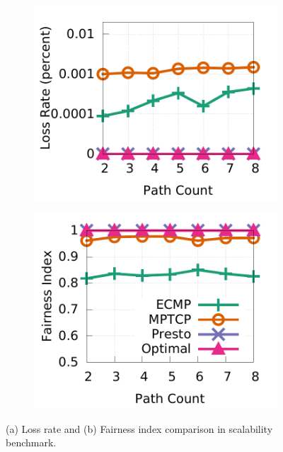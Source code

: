 \begin{figure}[!t]
        \centering
	\centering
        \begin{subfigure}[b]{0.45\textwidth}
                \centering
		\includegraphics[width=\textwidth]{presto/figures/scalability_test/scalability_compare_loss.pdf}
		\caption{}
		\label{micro_scalability_test_loss}
        \end{subfigure}
        \begin{subfigure}[b]{0.45\textwidth}
  		\includegraphics[width=\textwidth]{presto/figures/scalability_test/scalability_compare_fairness.pdf}
        	\caption{}
        	\label{micro_scalability_test_fairness}
	\end{subfigure}
	\caption{(a) Loss rate and (b) Fairness index comparison in scalability benchmark.}
\end{figure}

